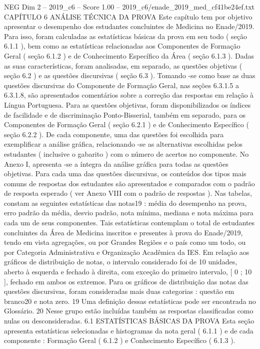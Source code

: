 \begin{textsample}{NEG Dim 2 – 2019\_c6 – Score 1.00 – 2019\_c6/enade\_2019\_med\_cf41be24ef.txt}  \label{ex:f2_neg_275}
CAPÍTULO 6 ANÁLISE TÉCNICA DA PROVA Este capítulo tem por objetivo apresentar o desempenho dos estudantes concluintes de Medicina no Enade/2019.
Para isso, foram calculadas as estatísticas básicas da prova em seu todo ( seção 6.1.1 ), bem como as estatísticas relacionadas aos Componentes de Formação Geral ( seção 6.1.2 ) e de Conhecimento Específico da Área ( seção 6.1.3 ).
Dadas as suas características, foram analisadas, em separado, as questões objetivas ( seção 6.2 ) e as questões discursivas ( seção 6.3 ).
Tomando -se como base as duas questões discursivas do Componente de Formação Geral, nas seções 6.3.1.5 a 6.3.1.8, são apresentados comentários sobre a correção das respostas em relação à Língua Portuguesa.
Para as questões objetivas, foram disponibilizados os índices de facilidade e de discriminação Ponto-Bisserial, também em separado, para os Componentes de Formação Geral ( seção 6.2.1 ) e de Conhecimento Específico ( seção 6.2.2 ).
De cada componente, uma das questões foi escolhida para exemplificar a análise gráfica, relacionando -se as alternativas escolhidas pelos estudantes ( inclusive o gabarito ) com o número de acertos no componente.
No Anexo I, apresenta -se a íntegra da análise gráfica para todas as questões objetivas.
Para cada uma das questões discursivas, os conteúdos dos tipos mais comuns de respostas dos estudantes são apresentados e comparados com o padrão de resposta esperado ( ver Anexo VIII com o padrão de respostas ).
Nas tabelas, constam as seguintes estatísticas das notas19 : média do desempenho na prova, erro padrão da média, desvio padrão, nota mínima, mediana e nota máxima para cada um de seus componentes.
Tais estatísticas contemplam o total de estudantes concluintes da Área de Medicina inscritos e presentes à prova do Enade/2019, tendo em vista agregações, ou por Grandes Regiões e o país como um todo, ou por Categoria Administrativa e Organização Acadêmica da IES.
Em relação aos gráficos de distribuição de notas, o intervalo considerado foi de 10 unidades, aberto à esquerda e fechado à direita, com exceção do primeiro intervalo, [ 0 ; 10 ], fechado em ambos os extremos.
Para os gráficos de distribuição das notas das questões discursivas, foram consideradas mais duas categorias : questão em branco20 e nota zero. 19 Uma definição dessas estatísticas pode ser encontrada no Glossário. 20 Nesse grupo estão incluídas também as respostas classificadas como nulas ou desconsideradas. 6.1 ESTATÍSTICAS BÁSICAS DA PROVA Esta seção apresenta estatísticas selecionadas e histogramas da nota geral ( 6.1.1 ) e de cada componente : Formação Geral ( 6.1.2 ) e Conhecimento Específico ( 6.1.3 ).

\end{textsample}
